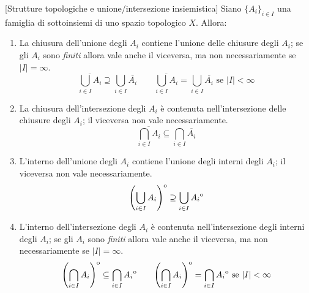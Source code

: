 \begin{proposition}{}[Strutture topologiche e unione/intersezione insiemistica]\label{chiusurainterno}
Siano $\{A_i\}_{i\in I}$ una famiglia di sottoinsiemi di uno spazio topologico $X$. Allora:
\begin{enumerate}
	\item La chiusura dell'unione degli $A_i$ contiene l'unione delle chiusure degli $A_i$; se gli $A_i$ sono \textit{finiti} allora vale anche il viceversa, ma non necessariamente se $\left|I\right|=\infty$.
	\begin{equation*}
		\overline{\bigcup_{i\in I}A_i}\supseteq\bigcup_{i\in I}\overline{A_i}\qquad\overline{\bigcup_{i\in I}A_i}=\bigcup_{i\in I}\overline{A_i}\text{ se }|I|<\infty
	\end{equation*}
	\item La chiusura dell'intersezione degli $A_i$ è contenuta nell'intersezione delle chiusure degli $A_i$; il viceversa non vale necessariamente.
		\begin{equation*}
		\overline{\bigcap_{i\in I}A_i}\subseteq\bigcap_{i\in I}\overline{A_i}
	\end{equation*}
	\item L'interno dell'unione degli $A_i$ contiene l'unione degli interni degli $A_i$; il viceversa non vale necessariamente.
	\begin{equation*}
		{\kern0pt\left(\bigcup_{i\in I}A_i\right)}^{\mathrm{o}}\supseteq\bigcup_{i\in I}{\kern0ptA_i}^{\mathrm{o}}
	\end{equation*}
	\item L'interno dell'intersezione degli $A_i$ è contenuta nell'intersezione degli interni degli $A_i$; se gli $A_i$ sono \textit{finiti} allora vale anche il viceversa, ma non necessariamente se $\left|I\right|=\infty$.
	\begin{equation*}
		{\kern0pt\left(\bigcap_{i\in I}A_i\right)}^{\mathrm{o}}\subseteq\bigcap_{i\in I}{\kern0ptA_i}^{\mathrm{o}}\qquad{\kern0pt\left(\bigcap_{i\in I}A_i\right)}^{\mathrm{o}}=\bigcap_{i\in I}{\kern0ptA_i}^{\mathrm{o}}\text{ se }|I|<\infty
	\end{equation*}
\end{enumerate}
\end{proposition}
